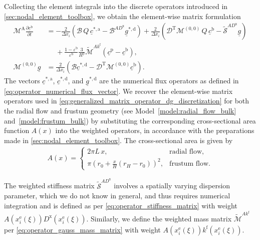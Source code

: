 Collecting the element integrals into the discrete operators introduced in \cref{sec:nodal_element_toolbox}, we obtain the element-wise matrix formulation
\begin{align}
    \label{eq:generalized_matrix_operator_dg_discretization}
    \mathcal{M}^{\mathrm{A}}
    \frac{\partial\underline{c}^\mathrm{b}}{\partial t}
    &=
    -\frac{2}{\Delta x_i}
    \left(
    \mathcal{B} \, Q \, \underline c^{*,\mathrm a}
    -
    \mathcal{B}^{AD^\mathrm{x}} \underline{g}^{*,\mathrm d}
    \right)
    +
    \frac{2}{\Delta x_i}
    \left(
    \mathcal{D}^\mathrm{T}\mathcal{M}^{(0,0)}
    \, Q \, \underline{c}^\mathrm{b}
    -
    \tilde{\mathcal{S}}^{AD^\mathrm{x}} \underline{g}
    \right)
    \nonumber \\
    &\phantom{={}}
    +
    \frac{1-\varepsilon^\mathrm b}{\varepsilon^\mathrm b}
    \frac{3}{R^\mathrm p}
    \tilde{\mathcal{M}}^{Ak^\mathrm{f}}
    \left(
    \underline c^\mathrm p
    -
    \underline{c}^\mathrm{b}
    \right),
    \\
    \label{eq:auxiliary_matrix_operator_dg_discretization}
    \mathcal{M}^{(0,0)}
    \underline{g}
    &=
    \frac{2}{\Delta x_i}
    \left(
    \mathcal{B}\underline c^{*,\mathrm d}
    -
    \mathcal{D}^\mathrm{T}\mathcal{M}^{(0,0)}
    \underline{c}^\mathrm{b}
    \right).
\end{align}
The vectors $\underline c^{*,\mathrm a}$, $\underline c^{*,\mathrm d}$, and $\underline{g}^{*,\mathrm d}$ are the numerical flux operators as defined in \cref{eq:operator_numerical_flux_vector}.
We recover the element-wise matrix operators used in \cref{eq:generalized_matrix_operator_dg_discretization} for both the radial flow and frustum geometry (see Model~\eqref{model:radial_flow_bulk} and~\eqref{model:frustum_bulk}) by substituting the corresponding cross-sectional area function $A(x)$ into the weighted operators, in accordance with the preparations made in \cref{sec:nodal_element_toolbox}.
The cross-sectional area is given by
\begin{align}
    A(x)=
    \begin{cases}
    2\pi L\,x,
    &
    \text{radial flow},
    \\[1ex]
    \displaystyle
    \pi
    \left(
    r_0+\frac{x}{H}(r_H-r_0)
    \right)^2,
    &
    \text{frustum flow}.
    \end{cases}
\end{align}

The weighted stiffness matrix $\tilde{\mathcal{S}}^{AD^\mathrm{x}}$ involves a spatially varying dispersion parameter, which we do not know in general, and thus requires numerical integration and is defined as per \eqref{eq:operator_stiffness_matrix} with weight $A(x^\mathrm{e}_i(\xi)) D^\mathrm{x}(x^\mathrm{e}_i(\xi))$.
Similarly, we define the weighted mass matrix $\tilde{\mathcal{M}}^{Ak^\mathrm{f}}$ per \eqref{eq:operator_gauss_mass_matrix} with weight $A(x^\mathrm{e}_i(\xi)) k^\mathrm{f}(x^\mathrm{e}_i(\xi))$.


